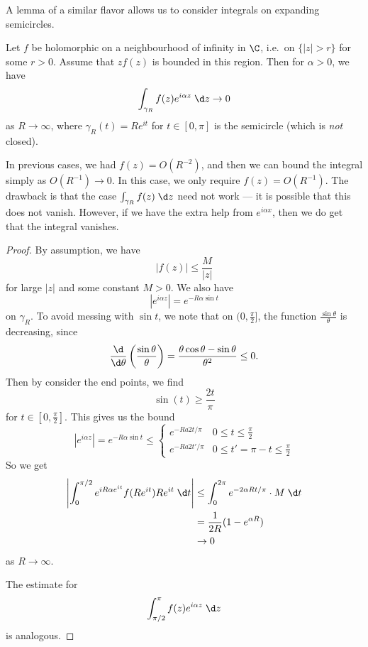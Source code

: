 \documentclass[a4paper]{article}
\begin{document}
A lemma of a similar flavor allows us to consider integrals on expanding semicircles.
\begin{lemma}
  Let $f$ be holomorphic on a neighbourhood of infinity in $\C$, i.e.\ on $\{|z| > r\}$ for some $r > 0$. Assume that $zf(z)$ is bounded in this region. Then for $\alpha > 0$, we have
  \[
    \int_{\gamma_R} f(z) e^{i\alpha z}\;\d z \to 0
  \]
  as $R \to \infty$, where $\gamma_R(t) = Re^{it}$ for $t \in [0, \pi]$ is the semicircle (which is \emph{not} closed).
  \begin{center}
  \end{center}
\end{lemma}
In previous cases, we had $f(z) = O(R^{-2})$, and then we can bound the integral simply as $O(R^{-1}) \to 0$. In this case, we only require $f(z) = O(R^{-1})$. The drawback is that the case $\int_{\gamma_R}f(z)\;\d z$ need not work --- it is possible that this does not vanish. However, if we have the extra help from $e^{i\alpha x}$, then we do get that the integral vanishes.

\begin{proof}
  By assumption, we have
  \[
    |f(z)| \leq \frac{M}{|z|}
  \]
  for large $|z|$ and some constant $M > 0$. We also have
  \[
    |e^{i \alpha z}| = e^{-R\alpha \sin t}
  \]
on $\gamma_R$. To avoid messing with $\sin t$, we note that on $(0, \frac{\pi}{2}]$, the function $\frac{\sin \theta}{\theta}$ is decreasing, since
\[
  \frac{\d}{\d \theta} \left(\frac{\sin \theta}{\theta}\right) = \frac{\theta \cos \theta - \sin \theta}{\theta^2} \leq 0.
\]
Then by consider the end points, we find
\[
  \sin(t) \geq \frac{2t}{\pi}
\]
for $t \in [0, \frac{\pi}{2}]$. This gives us the bound
\[
  |e^{i\alpha z}| = e^{-R\alpha \sin t} \leq
  \begin{cases}
    e^{-Ra2t/\pi} & 0 \leq t \leq \frac{\pi}{2}\\
    e^{-Ra2t'/\pi} & 0 \leq t' = \pi - t \leq \frac{\pi}{2}
  \end{cases}
\]
So we get
\begin{align*}
  \left|\int_0^{\pi/2} e^{iR\alpha e^{it}} f(Re^{it}) Re^{it}\;\d t\right| &\leq \int_0^{2\pi} e^{-2\alpha Rt/\pi} \cdot M \;\d t\\
  &= \frac{1}{2R} (1 - e^{\alpha R})\\
  &\to 0
\end{align*}
as $R \to \infty$.

The estimate for
\[
  \int_{\pi/2}^\pi f(z) e^{i\alpha z}\;\d z
\]
is analogous.
\end{proof}
\end{document}
